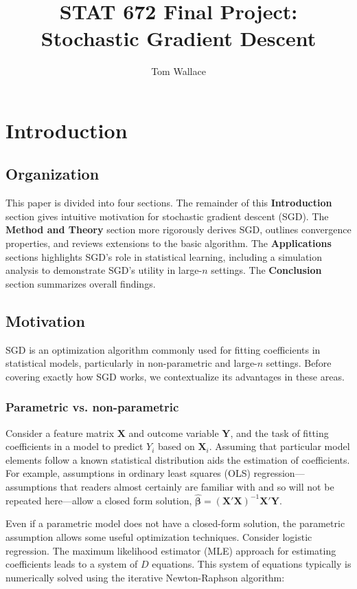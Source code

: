 \documentclass{article}
\author{Tom Wallace}
\title{STAT 672 Final Project:\\ Stochastic Gradient Descent}
\begin{document}
\maketitle

\section{Introduction}

\subsection{Organization}

This paper is divided into four sections. The remainder of this
\textbf{Introduction} section gives intuitive motivation for stochastic gradient
descent (SGD). The \textbf{Method and Theory} section more rigorously derives
SGD, outlines convergence properties, and reviews extensions to the basic
algorithm. The \textbf{Applications} sections highlights SGD's role in
statistical learning, including a simulation analysis to demonstrate SGD's utility
in large-$n$ settings. The \textbf{Conclusion} section summarizes
overall findings.

\subsection{Motivation}

SGD is an optimization algorithm commonly used for fitting coefficients
in statistical models, particularly in non-parametric and large-$n$ settings.
Before covering exactly how SGD works, we contextualize its advantages in these areas.

\subsubsection{Parametric vs. non-parametric}

Consider a feature matrix $\bm{X}$ and outcome variable $\bm{Y}$, and the task
of fitting coefficients in a model to predict $Y_i$ based on $\bm{X}_i$. 
Assuming that particular model elements follow a
known statistical distribution aids the estimation of coefficients. 
For example, assumptions in ordinary least squares (OLS)
regression---assumptions that readers almost certainly are familiar with and so will not be
repeated here---allow a closed form solution, $\hat{\bm{\beta}} = (\bm{X}'\bm{X})^{-1}\bm{X}'\bm{Y}$.

Even if a parametric model does not have a closed-form solution, the parametric
assumption allows some useful optimization techniques. Consider logistic
regression. The maximum likelihood estimator (MLE) approach for estimating
coefficients leads to a system of $D$ equations. This system of
equations typically is numerically solved using the iterative Newton-Raphson
algorithm:
\end{document}
